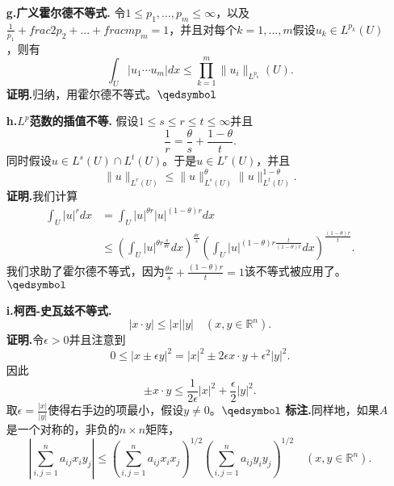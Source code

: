 \documentclass[leqno]{article}%
\begin{document}
\begin{enumerate}[fullwidth,itemindent=0em]
\item[\textbf{g.广义霍尔德不等式.}]令$1\leq p_{1},...,p_{m}\leq \infty$，以及$\frac{1}{p_{1}}+frac{2}{p_{2}}+...+frac{m}{p_{m}}=1$，并且对每个$k=1,...,m$假设$u_{k}\in L^{p_{k}}(U)$，则有
\begin{equation}
\int_{U}|u_{1}\cdots u_{m}|dx\leq \prod_{k=1}^{m}\|u_{i}\|_{L^{p_{k}}}(U).
\end{equation}
\textbf{证明.}归纳，用霍尔德不等式。$\hfill\qedsymbol$
\item[\textbf{h.$L^{p}$范数的插值不等.}]假设$1\leq s\leq r\leq t\leq \infty$并且
\begin{equation*}
\frac{1}{r}=\frac{\theta}{s}+\frac{1-\theta}{t}.
\end{equation*}
同时假设$u\in L^{s}(U)\cap L^{t}(U)$。于是$u\in L^{r}(U)$，并且
\begin{equation}
\|u\|_{L^{r}(U)}\leq \|u\|_{L^{s}(U)}^{\theta}\|u\|_{L^{t}(U)}^{1-\theta}.
\end{equation}
\textbf{证明.}我们计算
\begin{align*}
\int_{U}|u|^{r}dx&=\int_{U}|u|^{\theta r}|u|^{(1-\theta)r}dx\\
				 &\leq\left(\int_{U}|u|^{\theta r\frac{s}{\theta r}}dx\right)^{\frac{\theta r}{s}}\left(\int_{U}|u|^{(1-\theta)r\frac{t}{(1-\theta)r}}dx\right)^{\frac{(1-\theta)r}{t}}.
\end{align*}
我们求助了霍尔德不等式，因为$\frac{\theta r}{s}+\frac{(1-\theta)r}{t}=1$该不等式被应用了。$\hfill\qedsymbol$
\item[\textbf{i.柯西-史瓦兹不等式.}]
\begin{equation}
|x\cdot y|\leq|x||y|\quad (x,y\in\mathbb{R}^{n}).
\end{equation}
\textbf{证明.}令$\epsilon>0$并且注意到
\begin{equation*}
0\leq |x\pm\epsilon y|^{2}=|x|^{2}\pm2\epsilon x\cdot y+\epsilon^{2}|y|^{2}.
\end{equation*}
因此
\begin{equation*}
\pm x\cdot y\leq\frac{1}{2\epsilon}|x|^{2}+\frac{\epsilon}{2}|y|^{2}.
\end{equation*}
取$\epsilon=\frac{|x|}{|y|}$使得右手边的项最小，假设$y\neq0$。$\hfill\qedsymbol$
\textbf{标注.}同样地，如果$A$是一个对称的，非负的$n\times n$矩阵，
\begin{equation}
|\sum_{i,j=1}^{n}a_{ij}x_{i}y_{j}|\leq\left(\sum_{i,j=1}^{n}a_{ij}x_{i}x_{j}\right)^{1/2}\left(\sum_{i,j=1}^{n}a_{ij}y_{i}y_{j}\right)^{1/2}\quad (x,y\in\mathbb{R}^{n}).
\end{equation}

\end{enumerate}
\end{document}
